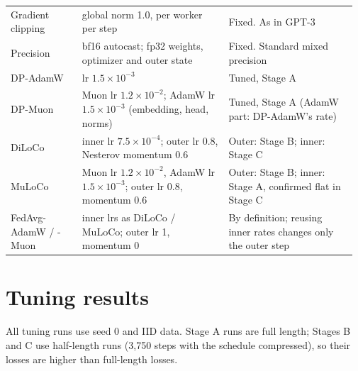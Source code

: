 \documentclass{article}
\begin{document}
\begin{table}[!htbp]
\begin{tabular}{@{}p{0.2\linewidth}p{0.41\linewidth}p{0.36\linewidth}@{}}
    Gradient clipping & global norm 1.0, per worker per step & Fixed. As in GPT-3~\cite{brown2020gpt3} \\
    Precision & bf16 autocast; fp32 weights, optimizer and outer state & Fixed. Standard mixed precision \\
    \midrule
    DP-AdamW & lr $1.5\times10^{-3}$ & Tuned, Stage A \\
    DP-Muon & Muon lr $1.2\times10^{-2}$; AdamW lr $1.5\times10^{-3}$ (embedding, head, norms) & Tuned, Stage A (AdamW part: DP-AdamW's rate) \\
    DiLoCo & inner lr $7.5\times10^{-4}$; outer lr 0.8, Nesterov momentum 0.6 & Outer: Stage B; inner: Stage C \\
    MuLoCo & Muon lr $1.2\times10^{-2}$, AdamW lr $1.5\times10^{-3}$; outer lr 0.8, momentum 0.6 & Outer: Stage B; inner: Stage A, confirmed flat in Stage C \\
    FedAvg-AdamW / -Muon & inner lrs as DiLoCo / MuLoCo; outer lr 1, momentum 0 & By definition; reusing inner rates changes only the outer step \\
    \bottomrule
  \end{tabular}
\end{table}

\section{Tuning results}\label{app:tuning}
All tuning runs use seed 0 and IID data. Stage A runs are full length; Stages B and C use half-length runs (3{,}750 steps with the schedule compressed), so their losses are higher than full-length losses.
\end{document}
